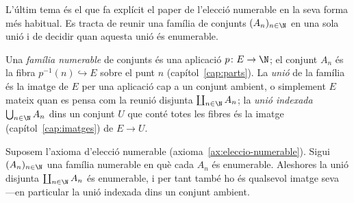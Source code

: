 L'últim tema és el que fa explícit el paper de l'elecció numerable en la
seva forma més habitual. Es tracta de reunir una família de conjunts
\((A_n)_{n\in\N}\) en una sola unió i de decidir quan aquesta unió és
enumerable.

\begin{definicio}\label{def:familia-numerable}
Una \emph{família numerable} de conjunts és una aplicació
\(p\colon E\to\N\); el conjunt \(A_n\) és la fibra
\(p^{-1}(n)\hookrightarrow E\) sobre el punt \(n\)
(capítol~\ref{cap:parts}). La \emph{unió} de la família és la imatge de
\(E\) per una aplicació cap a un conjunt ambient, o simplement \(E\) mateix
quan es pensa com la reunió disjunta \(\coprod_{n\in\N}A_n\); la
\emph{unió indexada} \(\bigcup_{n\in\N}A_n\) dins un conjunt \(U\) que
conté totes les fibres és la imatge (capítol~\ref{cap:imatges}) de \(E\to
U\).
\end{definicio}

\begin{teorema}\label{teo:unio-numerable}
Suposem l'axioma d'elecció numerable
(axioma~\ref{ax:eleccio-numerable}). Sigui \((A_n)_{n\in\N}\) una família
numerable en què cada \(A_n\) és enumerable. Aleshores la unió disjunta
\(\coprod_{n\in\N}A_n\) és enumerable, i per tant també ho és qualsevol
imatge seva ---en particular la unió indexada dins un conjunt ambient.
\end{teorema}

